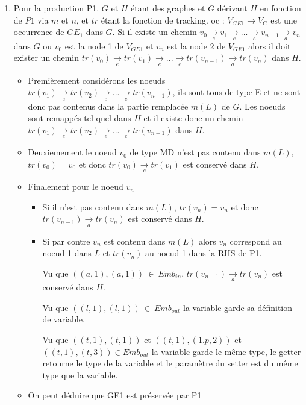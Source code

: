 \documentclass[a4paper, 12pt]{article}
\begin{document}
  \begin{enumerate}
    \item

    Pour la production P1. $G$ et $H$ étant des graphes et $G$ dérivant $H$ en fonction de $P1$ via $m$ et $n$, et $tr$ étant la fonction de tracking. oc :  \( {V_{GE1}} {\rightarrow} {V_G} \) est une occurrence de  {$GE_1$} dans $G$.
    Si il existe un chemin \( v_0 \underset{e}{\rightarrow} v_1 \underset{e}{\rightarrow} ... \underset{e}{\rightarrow} v_{n-1} \underset{a}{\rightarrow} v_n \) dans $G$
    ou {$v_0$} est la node 1 de {$V_{GE1}$} et {$v_n$} est la node 2 de $V_{GE1}$
    alors il doit exister un chemin \( tr(v_0) \underset{e}{\rightarrow} tr(v_1) \underset{e}{\rightarrow} ... \underset{e}{\rightarrow} tr(v_{n-1}) \underset{a}{\rightarrow} tr({v_n}) \) dans $H$.
    \begin{itemize}[label=\textbullet]
      \item Premièrement considérons les noeuds $tr(v_1) \underset{e}{\rightarrow} tr(v_2) \underset{e}{\rightarrow} ... \underset{e}{\rightarrow} tr(v_{n-1})$,
      ils sont tous de type E et ne sont donc pas contenus dans la partie remplacée $m(L)$ de $G$.
      Les noeuds sont remappés tel quel dans $H$ et il existe donc un chemin $tr(v_1) \underset{e}{\rightarrow} tr(v_2) \underset{e}{\rightarrow} ... \underset{e}{\rightarrow} tr(v_{n-1})$ dans $H$.

      \item Deuxiemement le noeud $v_0$ de type MD n'est pas contenu dans $m(L)$, $tr(v_0) = v_0$ et donc $tr(v_0) \underset{e}{\rightarrow} tr(v_1)$ est conservé dans $H$.

      \item Finalement pour le noeud {$v_n$}
      \begin{itemize}
      \item Si il n'est pas contenu dans $m(L)$, $tr(v_n)= v_n$ et donc $tr(v_{n-1}) \underset{a}{\rightarrow} tr(v_n)$ est conservé dans $H$.
      \item Si par contre $v_n$ est contenu dans $m(L)$ alors $v_n$ correspond au noeud 1 dans $L$ et $tr(v_n)$ au noeud 1 dans la RHS de P1.

      Vu que $((a,1),(a,1))~\in~Emb_{in}$, $tr(v_{n-1}) \underset{a}{\rightarrow} tr(v_n)$ est conservé dans $H$.

      Vu que $((l,1),(l,1))~\in~Emb_{out}$ la variable garde sa définition de variable.

      Vu que $((t,1),(t,1))$ et $((t,1),(1.p,2))$ et $((t,1),(t,3)) \in Emb_{out}$ la variable garde le même type, le getter retourne le type de la variable et le paramètre du setter est
      du même type que la variable.
    \end{itemize}
    \item On peut déduire que GE1 est préservée par P1
    \end{itemize}


\end{enumerate}
\end{document}
